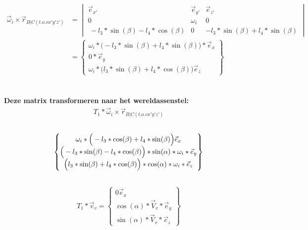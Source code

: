 \documentclass[a4paper,10pt]{article}
\begin{document}
\begin{equation}
	\begin{aligned}
		\vec{\omega}_i \times \vec{r}_{B|C(t.o.v x'y'z')} & = \begin{vmatrix}
			\vec{e}_{x'}& \vec{e}_{y'} & \vec{e}_{z'}\\
			0 & \omega_i & 0 \\
			\  -l_3 * \sin(\beta) - l_4 * \cos(\beta) & 0 &  -l_3*\sin(\beta) + l_4 *\sin(\beta)
		\end{vmatrix}\\
		&= \begin{Bmatrix}
			\omega_i*\Big(-l_3*\sin(\beta) + l_4 *\sin(\beta)\Big) *\vec{e}_{x}\\
			0*\vec{e}_{y}\\
			\omega_i*\Big(l_3 * \sin(\beta) + l_4 * \cos(\beta)\Big) \vec{e}_{z}
		\end{Bmatrix}
	\end{aligned}
\end{equation}\\
\\
\textbf {Deze matrix transformeren naar het wereldassenstel:}\\
\begin{equation}
	\begin{aligned}
		{T}_{1}* \vec{\omega}_i \times \vec{r}_{B|C(t.o.v x'y'z')}
	\end{aligned}
\end{equation}\\
\begin{equation}
	\begin{Bmatrix}
		{\omega_i*\Big( -l_3*\cos(\beta) + l_4 *\sin(\beta)\Big)\vec{e}_{x}}\\
		\Big(-l_3 * \sin(\beta)- l_4 * \cos(\beta)\Big)*\sin(\alpha) *\omega_i *\vec{e}_{y}\\
		\Big{(l_3 * \sin(\beta) + l_4 * \cos(\beta)\Big)*\cos(\alpha) *\omega_i*\vec{e}_{z}}
	\end{Bmatrix}
\end{equation}\\
\begin{equation}
	\begin{aligned}
		{T}_{1}* \vec{v}_v = \begin{Bmatrix}
			{0\vec{e}_{x}}\\
			\cos(\alpha)*\vec{V}_v*\vec{e}_{y}\\
			\sin(\alpha)*\vec{V}_v*\vec{e}_{z}
		\end{Bmatrix}
	\end{aligned}
\end{equation}\\
\end{document}
